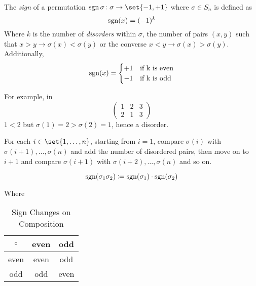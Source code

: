 \begin{definition}
    The \textit{sign} of a permutation $\Sign{\sigma} \colon \sigma \to \set{-1, +1}$ where $\sigma \in S_n$ is defined as
    \begin{equation}
        \operatorname{sgn}(x) = (-1)^{k}
    \end{equation}
    Where $k$ is the number of \textit{disorders} within $\sigma$, the number of pairs $(x, y)$ such that $x > y \to \sigma(x) < \sigma(y)$ or the converse $x < y \to \sigma(x) > \sigma(y)$. Additionally,
    \begin{equation}
        \operatorname{sgn}(x) = \begin{cases}
            +1 &\text{if k is even} \\
            -1 &\text{if k is odd}
        \end{cases}
    \end{equation}
\end{definition}

\begin{remark}
    For example, in
    \begin{equation*}
        \begin{pmatrix}
            1 & 2 & 3 \\
            2 & 1 & 3
        \end{pmatrix}
    \end{equation*}
    $1 < 2$ but $\sigma(1) = 2 > \sigma(2) = 1$, hence a disorder.
    
    For each $i \in \set{1, \dots, n}$, starting from $i = 1$, compare $\sigma(i)$ with $\sigma(i + 1), \dots, \sigma(n)$ and add the number of disordered pairs, then move on to $i + 1$ and compare $\sigma(i + 1)$ with $\sigma(i + 2), \dots, \sigma(n)$ and so on.
\end{remark}

\begin{theorem}
	\begin{equation}
		\operatorname{sgn}(\sigma_1 \sigma_2) \coloneqq \operatorname{sgn}(\sigma_1) \cdot \operatorname{sgn}(\sigma_2)
	\end{equation}
\end{theorem}

Where
\begin{table}[H]
\centering
\begin{tabular}{c | c c}
\toprule
$\circ$ & even & odd  \\
\midrule
even    & even & odd  \\
odd     & odd  & even \\
\bottomrule
\end{tabular}
\caption{Sign Changes on Composition}
\end{table}
